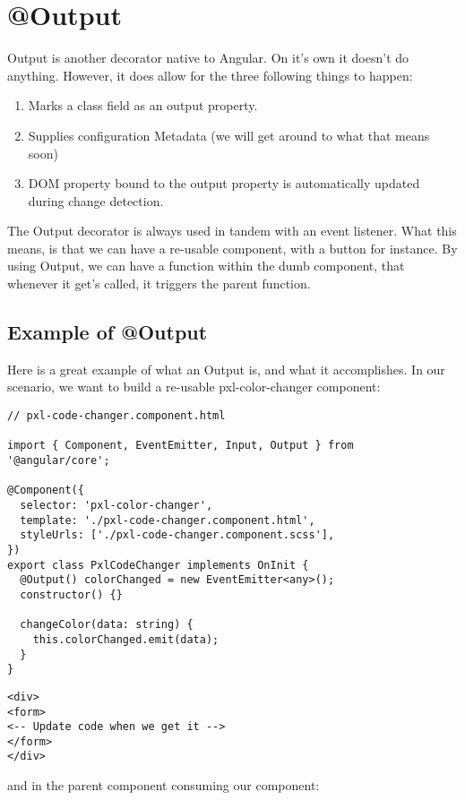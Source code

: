 
\section{ @Output }

Output is another decorator native to Angular. On it's own it doesn't do
anything. However, it does allow for the three following things to happen:
\begin{enumerate}
  \item Marks a class field as an output property.
  \item Supplies configuration Metadata (we will get around to what that means
  soon)
  \item DOM property bound to the output property is automatically updated
  during change detection.
\end{enumerate}

The Output decorator is always used in tandem with an event listener. What this
means, is that we can have a re-usable component, with a button for instance.
By using Output, we can have a function within the dumb component, that whenever
it get's called, it triggers the parent function.

\subsection{ Example of @Output }

Here is a great example of what an Output is, and what it accomplishes. In
our scenario, we want to build a re-usable pxl-color-changer component:
\begin{lstlisting}
// pxl-code-changer.component.html

import { Component, EventEmitter, Input, Output } from '@angular/core';

@Component({
  selector: 'pxl-color-changer',
  template: './pxl-code-changer.component.html',
  styleUrls: ['./pxl-code-changer.component.scss'],
})
export class PxlCodeChanger implements OnInit {
  @Output() colorChanged = new EventEmitter<any>();
  constructor() {}

  changeColor(data: string) {
    this.colorChanged.emit(data);
  }
}
\end{lstlisting}

\begin{lstlisting}
<div>
<form>
<-- Update code when we get it -->
</form>
</div>
\end{lstlisting}

and in the parent component consuming our component:


